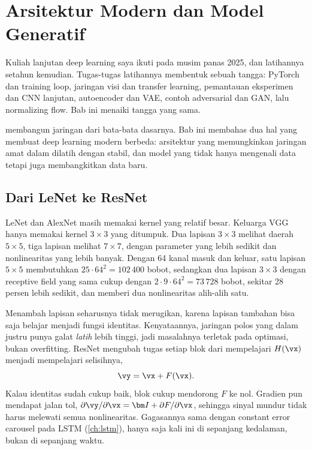 \chapter{Arsitektur Modern dan Model Generatif}
\label{ch:arsitektur}

Kuliah lanjutan deep learning saya ikuti pada musim panas 2025, dan latihannya setahun kemudian.
Tugas-tugas latihannya membentuk sebuah tangga: PyTorch dan training loop, jaringan visi dan
transfer learning, pemantauan eksperimen dan CNN lanjutan, autoencoder dan VAE, contoh adversarial
dan GAN, lalu normalizing flow. Bab ini menaiki tangga yang sama.

 membangun jaringan dari bata-bata dasarnya. Bab ini membahas dua hal yang
membuat deep learning modern berbeda: arsitektur yang memungkinkan jaringan amat dalam dilatih
dengan stabil, dan model yang tidak hanya mengenali data tetapi juga membangkitkan data baru.

\section{Dari LeNet ke ResNet}

LeNet \citep{lecun1998} dan AlexNet \citep{krizhevsky2017} masih memakai kernel yang relatif besar.
Keluarga VGG hanya memakai kernel $3\times3$ yang ditumpuk. Dua lapisan $3\times3$ melihat daerah
$5\times5$, tiga lapisan melihat $7\times7$, dengan parameter yang lebih sedikit dan nonlinearitas
yang lebih banyak. Dengan 64 kanal masuk dan keluar, satu lapisan $5\times5$ membutuhkan
$25\cdot64^2=102\,400$ bobot, sedangkan dua lapisan $3\times3$ dengan receptive field yang sama
cukup dengan $2\cdot9\cdot64^2=73\,728$ bobot, sekitar 28 persen lebih sedikit, dan memberi dua
nonlinearitas alih-alih satu.

Menambah lapisan seharusnya tidak merugikan, karena lapisan tambahan bisa saja belajar menjadi
fungsi identitas. Kenyataannya, jaringan polos yang dalam justru punya galat \emph{latih}
lebih tinggi, jadi masalahnya terletak pada optimasi, bukan overfitting. ResNet \citep{he2016}
mengubah tugas setiap blok dari mempelajari $H(\vx)$ menjadi mempelajari selisihnya,
\begin{equation}
\vy=\vx+F(\vx).
\end{equation}
Kalau identitas sudah cukup baik, blok cukup mendorong $F$ ke nol. Gradien pun mendapat jalan tol,
$\partial\vy/\partial\vx=\bm I+\partial F/\partial\vx$, sehingga sinyal mundur tidak harus melewati
semua nonlinearitas. Gagasannya sama dengan constant error carousel pada LSTM (\cref{ch:lstm}),
hanya saja kali ini di sepanjang kedalaman, bukan di sepanjang waktu.


